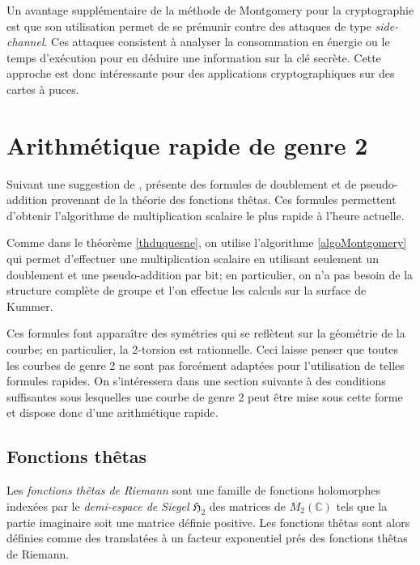 \documentclass[a4paper,12pt]{article}
\theoremstyle{definition}
\theoremstyle{remark}
\numberwithin{equation}{section}
\begin{document}
Un avantage supplémentaire de la méthode de Montgomery pour la cryptographie est que son utilisation permet de se prémunir contre des attaques de type \emph{side-channel}. Ces attaques consistent à analyser la consommation en énergie ou le temps d'exécution pour en déduire une information sur la clé secrète. Cette approche est donc intéressante pour des applications cryptographiques sur des cartes à puces.

\section{Arithmétique rapide de genre 2}

Suivant une suggestion de \cite{chudnovsky}, \citep{gaudry} présente des formules de doublement et de pseudo-addition provenant de la théorie des fonctions thêtas. Ces formules permettent d'obtenir l'algorithme de multiplication scalaire le plus rapide à l'heure actuelle.

Comme dans le théorème \ref{thduquesne}, on utilise l'algorithme \ref{algoMontgomery} qui permet d'effectuer une multiplication scalaire en utilisant seulement un doublement et une pseudo-addition par bit; en particulier, on n'a pas besoin de la structure complète de groupe et l'on effectue les calculs sur la surface de Kummer.

Ces formules font apparaître des symétries qui se reflètent sur la géométrie de la courbe; en particulier, la 2-torsion est rationnelle. Ceci laisse penser que toutes les courbes de genre 2 ne sont pas forcément adaptées pour l'utilisation de telles formules rapides. On s'intéressera dans une section suivante à des conditions suffisantes sous lesquelles une courbe de genre 2 peut être mise sous cette forme et dispose donc d'une arithmétique rapide. 

\subsection{Fonctions thêtas}
Les \emph{fonctions thêtas de Riemann} sont une famille de fonctions holomorphes indexées par le \emph{demi-espace de Siegel} $\mathfrak{H}_2$ des matrices de $M_2(\mathbb{C})$ tels que la partie imaginaire soit une matrice définie positive. Les fonctions thêtas sont alors définies comme des translatées à un facteur exponentiel prés des fonctions thêtas de Riemann.
\end{document}
